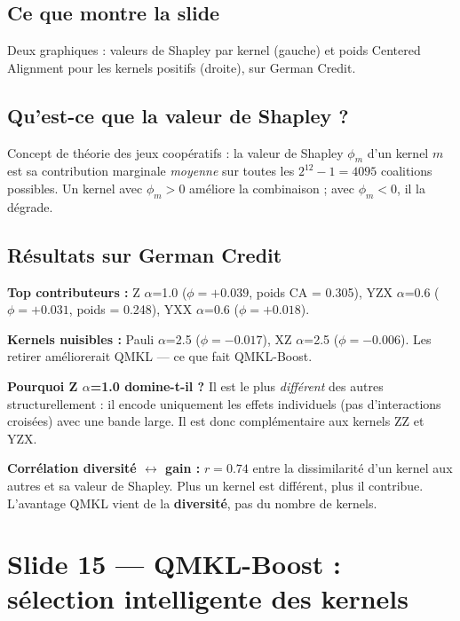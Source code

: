 \documentclass[12pt, a4paper]{article}
\begin{document}
\subsection*{Ce que montre la slide}

Deux graphiques : valeurs de Shapley par kernel (gauche)
et poids Centered Alignment pour les kernels positifs (droite), sur German Credit.

\subsection*{Qu'est-ce que la valeur de Shapley ?}

Concept de théorie des jeux coopératifs : la valeur de Shapley $\phi_m$ d'un kernel $m$
est sa contribution marginale \emph{moyenne} sur toutes les $2^{12}-1 = 4095$ coalitions possibles.
Un kernel avec $\phi_m > 0$ améliore la combinaison ; avec $\phi_m < 0$, il la dégrade.

\subsection*{Résultats sur German Credit}

\textbf{Top contributeurs :} Z $\alpha$=1.0 ($\phi = +0.039$, poids CA = 0.305),
YZX $\alpha$=0.6 ($\phi = +0.031$, poids = 0.248), YXX $\alpha$=0.6 ($\phi = +0.018$).

\textbf{Kernels nuisibles :} Pauli $\alpha$=2.5 ($\phi = -0.017$), XZ $\alpha$=2.5 ($\phi = -0.006$).
Les retirer améliorerait QMKL — ce que fait QMKL-Boost.

\textbf{Pourquoi Z $\alpha$=1.0 domine-t-il ?}
Il est le plus \emph{différent} des autres structurellement : il encode uniquement les effets
individuels (pas d'interactions croisées) avec une bande large.
Il est donc complémentaire aux kernels ZZ et YZX.

\begin{bon}
\textbf{Corrélation diversité $\leftrightarrow$ gain :} $r = 0.74$
entre la dissimilarité d'un kernel aux autres et sa valeur de Shapley.
Plus un kernel est différent, plus il contribue.
L'avantage QMKL vient de la \textbf{diversité}, pas du nombre de kernels.
\end{bon}

\section{Slide 15 — QMKL-Boost : sélection intelligente des kernels}
\end{document}

